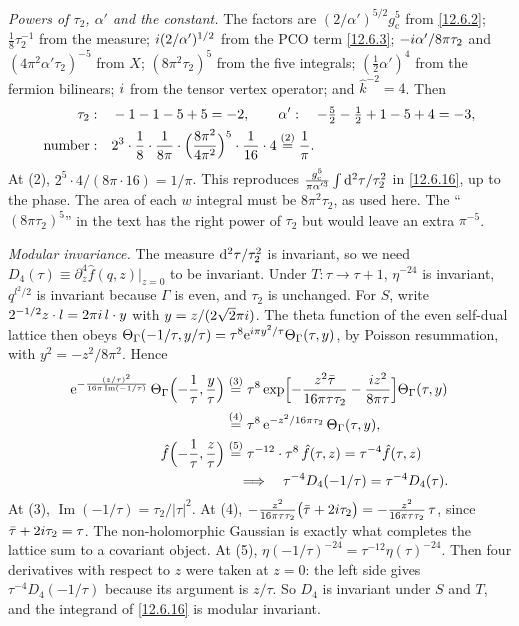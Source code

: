 \begin{tcolorbox}[breakable]
\begin{remark}
		\emph{Powers of $\tau_{2}$, $\alpha'$ and the constant.} The factors are $(2/\alpha')^{5/2}g_{\mathrm c}^{5}$ from \eqref{12.6.2}; $\frac18\tau_{2}^{-1}$ from the measure; $i(2/\alpha')^{1/2}$ from the PCO term \eqref{12.6.3}; $-i\alpha'/8\pi\tau_{2}$ and $(4\pi^{2}\alpha'\tau_{2})^{-5}$ from $X$; $(8\pi^{2}\tau_{2})^{5}$ from the five integrals; $(\frac12\alpha')^{4}$ from the fermion bilinears; $i$ from the tensor vertex operator; and $\hat k^{-2}=4$. Then
		\begin{align*}
			\tau_{2}:&\quad -1-1-5+5=-2 ,\qquad \alpha':\quad -\tfrac52-\tfrac12+1-5+4=-3 ,\\
			\text{number}:&\quad 2^{3}\cdot\frac18\cdot\frac{1}{8\pi}\cdot\Bigl(\frac{8\pi^{2}}{4\pi^{2}}\Bigr)^{5}\cdot\frac1{16}\cdot4\overset{(2)}{=} \frac1\pi .
		\end{align*}
		At (2), $2^{5}\cdot4/(8\pi\cdot16)=1/\pi$. This reproduces $\frac{g_{\mathrm c}^{5}}{\pi\alpha'^{3}}\int\mathrm{d}^{2}\tau/\tau_{2}^{2}$ in \eqref{12.6.16}, up to the phase. The area of each $w$ integral must be $8\pi^{2}\tau_{2}$, as used here. The ``$(8\pi\tau_{2})^{5}$'' in the text has the right power of $\tau_{2}$ but would leave an extra $\pi^{-5}$.

		\emph{Modular invariance.} The measure $\mathrm{d}^{2}\tau/\tau_{2}^{2}$ is invariant, so we need $D_{4}(\tau)\equiv\partial^{4}_{z}\hat f(q,z)|_{z=0}$ to be invariant. Under $T:\tau\to\tau+1$, $\eta^{-24}$ is invariant, $q^{l^{2}/2}$ is invariant because $\Gamma$ is even, and $\tau_{2}$ is unchanged. For $S$, write $2^{-1/2}z\cdot l=2\pi i\,l\cdot y$ with $y=z/(2\sqrt2\pi i)$. The theta function of the even self-dual lattice then obeys $\Theta_{\Gamma}(-1/\tau,y/\tau)=\tau^{8}\mathrm{e}^{i\pi y^{2}/\tau}\Theta_{\Gamma}(\tau,y)$, by Poisson resummation, with $y^{2}=-z^{2}/8\pi^{2}$. Hence
		\begin{align*}
			\mathrm{e}^{-\frac{(z/\tau)^{2}}{16\pi\operatorname{Im}(-1/\tau)}}\,\Theta_{\Gamma}\Bigl(-\frac1\tau,\frac y\tau\Bigr)
			&\overset{(3)}{=} \tau^{8}\exp\Bigl[-\frac{z^{2}\bar\tau}{16\pi\tau\tau_{2}}-\frac{i z^{2}}{8\pi\tau}\Bigr]\Theta_{\Gamma}(\tau,y)\\
			&\overset{(4)}{=} \tau^{8}\,\mathrm{e}^{-z^{2}/16\pi\tau_{2}}\,\Theta_{\Gamma}(\tau,y) ,\\
			\hat f\Bigl(-\frac1\tau,\frac z\tau\Bigr)&\overset{(5)}{=} \tau^{-12}\cdot\tau^{8}\,\hat f(\tau,z)=\tau^{-4}\hat f(\tau,z)\\
			&\quad\Longrightarrow\quad \tau^{-4}D_{4}(-1/\tau)=\tau^{-4}D_{4}(\tau) .
		\end{align*}
		At (3), $\operatorname{Im}(-1/\tau)=\tau_{2}/|\tau|^{2}$. At (4), $-\frac{z^{2}}{16\pi\tau\tau_{2}}\bigl(\bar\tau+2i\tau_{2}\bigr)=-\frac{z^{2}}{16\pi\tau\tau_{2}}\,\tau$, since $\bar\tau+2i\tau_{2}=\tau$. The non-holomorphic Gaussian is exactly what completes the lattice sum to a covariant object. At (5), $\eta(-1/\tau)^{-24}=\tau^{-12}\eta(\tau)^{-24}$. Then four derivatives with respect to $z$ were taken at $z=0$: the left side gives $\tau^{-4}D_{4}(-1/\tau)$ because its argument is $z/\tau$. So $D_{4}$ is invariant under $S$ and $T$, and the integrand of \eqref{12.6.16} is modular invariant.
	\end{remark}
\end{tcolorbox}
